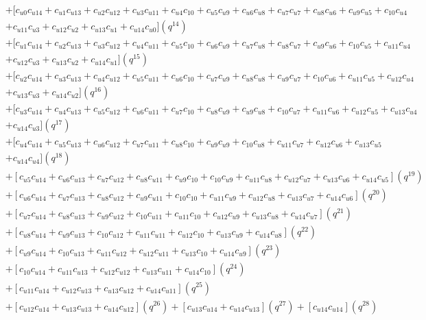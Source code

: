 \documentclass[12pt]{article}
\begin{document}
\begin{align}
    &+ [c_{u0}c_{u14} + c_{u1}c_{u13} + c_{u2}c_{u12} + c_{u3}c_{u11} + c_{u4}c_{10} + c_{u5}c_{u9} + c_{u6}c_{u8} + c_{u7}c_{u7} + c_{u8}c_{u6} + c_{u9}c_{u5} + c_{10}c_{u4} \nonumber\\
    &+ c_{u11}c_{u3} + c_{u12}c_{u2} + c_{u13}c_{u1} + c_{u14}c_{u0} ](q^{14}) \nonumber\\
    &+ [c_{u1}c_{u14} + c_{u2}c_{u13} + c_{u3}c_{u12} + c_{u4}c_{u11} + c_{u5}c_{10} + c_{u6}c_{u9} + c_{u7}c_{u8} + c_{u8}c_{u7} + c_{u9}c_{u6} + c_{10}c_{u5} + c_{u11}c_{u4} \nonumber\\
    &+ c_{u12}c_{u3} + c_{u13}c_{u2} + c_{u14}c_{u1} ](q^{15}) \nonumber\\
    &+ [c_{u2}c_{u14} + c_{u3}c_{u13} + c_{u4}c_{u12} + c_{u5}c_{u11} + c_{u6}c_{10} + c_{u7}c_{u9} + c_{u8}c_{u8} + c_{u9}c_{u7} + c_{10}c_{u6} + c_{u11}c_{u5} + c_{u12}c_{u4} \nonumber\\
    &+ c_{u13}c_{u3} + c_{u14}c_{u2}](q^{16})\nonumber\\
    &+ [c_{u3}c_{u14} + c_{u4}c_{u13} + c_{u5}c_{u12} + c_{u6}c_{u11} + c_{u7}c_{10} + c_{u8}c_{u9} + c_{u9}c_{u8} + c_{10}c_{u7} + c_{u11}c_{u6} + c_{u12}c_{u5} + c_{u13}c_{u4} \nonumber\\
    &+ c_{u14}c_{u3}](q^{17}) \nonumber\\
    &+ [c_{u4}c_{u14} + c_{u5}c_{u13} + c_{u6}c_{u12} + c_{u7}c_{u11} + c_{u8}c_{10} + c_{u9}c_{u9} + c_{10}c_{u8} + c_{u11}c_{u7} + c_{u12}c_{u6} + c_{u13}c_{u5} \nonumber\\
    &+ c_{u14}c_{u4}](q^{18}) \nonumber\\
    &+ [c_{u5}c_{u14} + c_{u6}c_{u13} + c_{u7}c_{u12} + c_{u8}c_{u11} + c_{u9}c_{10} + c_{10}c_{u9} + c_{u11}c_{u8} + c_{u12}c_{u7} + c_{u13}c_{u6} + c_{u14}c_{u5}](q^{19}) \nonumber\\
    &+ [c_{u6}c_{u14} + c_{u7}c_{u13} + c_{u8}c_{u12} + c_{u9}c_{u11} + c_{10}c_{10} + c_{u11}c_{u9} + c_{u12}c_{u8} + c_{u13}c_{u7} + c_{u14}c_{u6}](q^{20}) \nonumber\\
    &+ [c_{u7}c_{u14} + c_{u8}c_{u13} + c_{u9}c_{u12} + c_{10}c_{u11} + c_{u11}c_{10} + c_{u12}c_{u9} + c_{u13}c_{u8} + c_{u14}c_{u7}](q^{21}) \nonumber\\
    &+ [c_{u8}c_{u14} + c_{u9}c_{u13} + c_{10}c_{u12} + c_{u11}c_{u11} + c_{u12}c_{10} + c_{u13}c_{u9} + c_{u14}c_{u8}](q^{22}) \nonumber\\
    &+ [c_{u9}c_{u14} + c_{10}c_{u13} + c_{u11}c_{u12} + c_{u12}c_{u11} + c_{u13}c_{10} + c_{u14}c_{u9}](q^{23}) \nonumber\\
    &+ [c_{10}c_{u14} + c_{u11}c_{u13} + c_{u12}c_{u12} + c_{u13}c_{u11} + c_{u14}c_{10}](q^{24}) \nonumber\\
    &+ [c_{u11}c_{u14} + c_{u12}c_{u13} + c_{u13}c_{u12} + c_{u14}c_{u11}](q^{25}) \nonumber\\
    &+ [c_{u12}c_{u14} + c_{u13}c_{u13} + c_{u14}c_{u12}](q^{26}) + [c_{u13}c_{u14} + c_{u14}c_{u13}](q^{27}) + [c_{u14}c_{u14}](q^{28})
\end{align}
\end{document}
